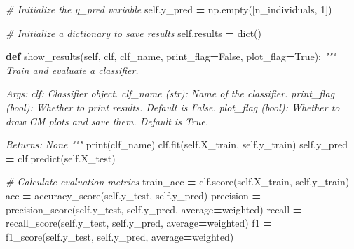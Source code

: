 \documentclass[
]{book}
\newenvironment{Shaded}{\begin{snugshade}}{\end{snugshade}}
\newcommand{\BuiltInTok}[1]{#1}
\newcommand{\CommentTok}[1]{\textcolor[rgb]{0.56,0.35,0.01}{\textit{#1}}}
\newcommand{\DecValTok}[1]{\textcolor[rgb]{0.00,0.00,0.81}{#1}}
\newcommand{\KeywordTok}[1]{\textcolor[rgb]{0.13,0.29,0.53}{\textbf{#1}}}
\newcommand{\NormalTok}[1]{#1}
\newcommand{\OperatorTok}[1]{\textcolor[rgb]{0.81,0.36,0.00}{\textbf{#1}}}
\newcommand{\StringTok}[1]{\textcolor[rgb]{0.31,0.60,0.02}{#1}}
\newcommand{\VariableTok}[1]{\textcolor[rgb]{0.00,0.00,0.00}{#1}}
\theoremstyle{definition}
\theoremstyle{definition}
\theoremstyle{definition}
\theoremstyle{definition}
\theoremstyle{remark}
\begin{document}
\begin{Shaded}
\begin{Highlighting}[]
        \CommentTok{\# Initialize the y\_pred variable}
        \VariableTok{self}\NormalTok{.y\_pred }\OperatorTok{=}\NormalTok{ np.empty([n\_individuals, }\DecValTok{1}\NormalTok{])}

        \CommentTok{\# Initialize a dictionary to save results}
        \VariableTok{self}\NormalTok{.results }\OperatorTok{=} \BuiltInTok{dict}\NormalTok{()}

    \KeywordTok{def}\NormalTok{ show\_results(}\VariableTok{self}\NormalTok{, clf, clf\_name, print\_flag}\OperatorTok{=}\VariableTok{False}\NormalTok{, plot\_flag}\OperatorTok{=}\VariableTok{True}\NormalTok{):}
        \CommentTok{"""}
\CommentTok{        Train and evaluate a classifier.}

\CommentTok{        Args:}
\CommentTok{            clf: Classifier object.}
\CommentTok{            clf\_name (str): Name of the classifier.}
\CommentTok{            print\_flag (bool): Whether to print results. Default is False.}
\CommentTok{            plot\_flag (bool): Whether to draw CM plots and save them. Default is True.}

\CommentTok{        Returns:}
\CommentTok{            None}
\CommentTok{        """}
        \BuiltInTok{print}\NormalTok{(clf\_name)}
\NormalTok{        clf.fit(}\VariableTok{self}\NormalTok{.X\_train, }\VariableTok{self}\NormalTok{.y\_train)}
        \VariableTok{self}\NormalTok{.y\_pred }\OperatorTok{=}\NormalTok{ clf.predict(}\VariableTok{self}\NormalTok{.X\_test)}

        \CommentTok{\# Calculate evaluation metrics}
\NormalTok{        train\_acc }\OperatorTok{=}\NormalTok{ clf.score(}\VariableTok{self}\NormalTok{.X\_train, }\VariableTok{self}\NormalTok{.y\_train)}
\NormalTok{        acc }\OperatorTok{=}\NormalTok{ accuracy\_score(}\VariableTok{self}\NormalTok{.y\_test, }\VariableTok{self}\NormalTok{.y\_pred)}
\NormalTok{        precision }\OperatorTok{=}\NormalTok{ precision\_score(}\VariableTok{self}\NormalTok{.y\_test, }\VariableTok{self}\NormalTok{.y\_pred, average}\OperatorTok{=}\StringTok{\textquotesingle{}weighted\textquotesingle{}}\NormalTok{)}
\NormalTok{        recall }\OperatorTok{=}\NormalTok{ recall\_score(}\VariableTok{self}\NormalTok{.y\_test, }\VariableTok{self}\NormalTok{.y\_pred, average}\OperatorTok{=}\StringTok{\textquotesingle{}weighted\textquotesingle{}}\NormalTok{)}
\NormalTok{        f1 }\OperatorTok{=}\NormalTok{ f1\_score(}\VariableTok{self}\NormalTok{.y\_test, }\VariableTok{self}\NormalTok{.y\_pred, average}\OperatorTok{=}\StringTok{\textquotesingle{}weighted\textquotesingle{}}\NormalTok{)}


\end{Highlighting}
\end{Shaded}
\end{document}
